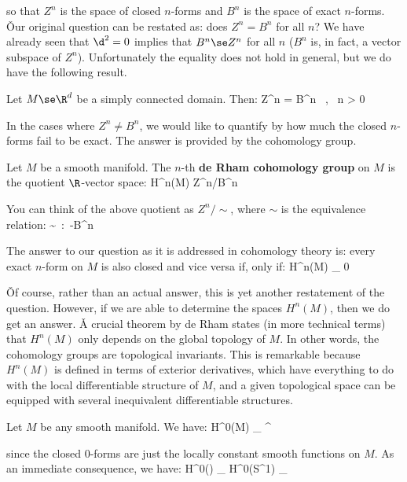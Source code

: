 so that $Z^n$ is the space of closed $n$-forms and $B^n$ is the space of exact $n$-forms. \v

Our original question can be restated as: does $Z^n=B^n$ for all $n$? We have already seen that $\d^2=0$ implies that
$B^n\se Z^n$ for all $n$ ($B^n$ is, in fact, a vector subspace of $Z^n$). Unfortunately the equality does not hold in
general, but we do have the following result.

Let $M\se \R^d$ be a simply connected domain. Then:
\bse
Z^n = B^n \, , \qquad \forall \, n > 0
\ese
\et

In the cases where $Z^n\neq B^n$, we would like to quantify by how much the closed $n$-forms fail to be exact. The
answer is provided by the cohomology group.

Let $M$ be a smooth manifold. The $n$-th \textbf{de Rham cohomology group} on $M$ is the quotient $\R$-vector space:
\bse
H^n(M) \coloneqq Z^n/B^n
\ese
\ed

You can think of the above quotient as $Z^n/\!\sim$, where $\sim$ is the equivalence relation:
\bse
\omega \sim \sigma\ :\Leftrightarrow\ \omega-\sigma \in B^n
\ese

The answer to our question as it is addressed in cohomology theory is: every exact $n$-form on $M$ is also closed and
vice versa if, only if:
\bse
H^n(M) \cong_ 0
\ese

\v

Of course, rather than an actual answer, this is yet another restatement of the question. However, if we are able to
determine the spaces $H^n(M)$, then we do get an answer. \v

A crucial theorem by de Rham states (in more technical terms) that $H^n(M)$ only depends on the global topology of
$M$. In other words, the cohomology groups are topological invariants. This is remarkable because $H^n(M)$ is defined
in terms of exterior derivatives, which have everything to do with the local differentiable structure of $M$, and a
given topological space can be equipped with several inequivalent differentiable structures.

\be
Let $M$ be any smooth manifold. We have:
\bse
H^0(M) \cong_ \R^{}
\ese

since the closed $0$-forms are just the locally constant smooth functions on $M$. As an immediate consequence, we have:
\bse
H^0(\R) \cong_ H^0(S^1) \cong_ \R
\ese
\ee

